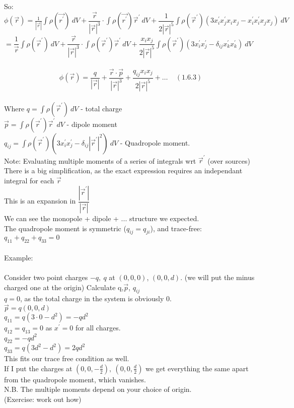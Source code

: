 \documentclass[a4paper,11pt]{article}
\begin{document}
So:\\
$\phi(\vec{r})=\frac{1}{|\vec{r}|}\int \rho(\vec{r^\prime})~dV +\dfrac{\vec{r}}{|\vec{r}|^3} \cdot\int \rho(\vec{r^\prime})\vec{r}^\prime ~dV + \dfrac{1}{2|\vec{r}|^5}\int \rho(\vec{r}^\prime)(3x_i ^\prime x_j ^\prime x_ix_j-x_i^\prime x_i ^\prime x_jx_j) ~dV$\\
$=\dfrac{1}{\vec{r}}\int \rho(\vec{r}^\prime)~dV+\dfrac{\vec{r}}{|\vec{r}|^3} \cdot\int \rho(\vec{r}^\prime) \vec{r}^\prime ~dV +\dfrac{x_i x_j}{2|\vec{r}|^5}\int \rho(\vec{r}^\prime)(3x_i ^\prime x_j ^\prime -\delta_{ij}x_k ^\prime x_k ^\prime)~dV$\\
\\
$$\phi(\vec{r})=\dfrac{q}{|\vec{r}|}+\dfrac{\vec{r}\cdot\vec{p}}{|\vec{r}|^3} + \dfrac{q_{ij}x_i x_j}{2|\vec{r}|^5}+\ldots~~~~~(1.6.3)$$\\
Where $q=\int \rho(\vec{r}^\prime)~dV$ - total charge\\
$\vec{p}=\int \rho(\vec{r}^\prime)\vec{r}^\prime~dV$ - dipole moment\\
$q_{ij}=\int \rho(\vec{r}^\prime)(3x_i ^\prime x_j ^\prime - \delta_{ij}|\vec{r}^\prime|^2)~dV$ - Quadropole moment.\\
Note: Evaluating multiple moments of a series of integrals wrt $\vec{r}^\prime$ (over sources)\\
There is a big simplification, as the exact expression requires an independant integral for each $\vec{r}$\\
This is an expansion in $\dfrac{|\vec{r}^\prime|}{|\vec{r}|}$\\
We can see the monopole + dipole + ... structure we expected.\\
The quadropole moment is symmetric ($q_{ij}=q_{ji}$), and trace-free: $q_{11}+q_{22}+q_{33}=0$\\
\\
Example:\\
\\
Consider two point charges $-q,~q$ at $(0,0,0)$, $(0,0,d)$. (we will put the minus charged one at the origin)
Calculate q,$\vec{p}$, $q_{ij}$\\
$q=0$, as the total charge in the system is obviously 0.\\
$\vec{p}=q(0,0,d)$\\
$q_{11}=q(3\cdot0 - d^2)=-qd^2$\\
$q_{12}=q_{13}=0$ as $x^\prime = 0$ for all charges.\\
$q_{22}=-qd^2$\\
$q_{33}=q(3d^2-d^2)=2qd^2$\\
This fits our trace free condition as well.\\
If I put the charges at $(0,0,-\frac{d}{2}),~(0,0,\frac{d}{2})$ we get everything the same apart from the quadropole moment, which vanishes.\\
N.B. The multiple moments depend on your choice of origin.\\
(Exercise: work out how)
\end{document}

